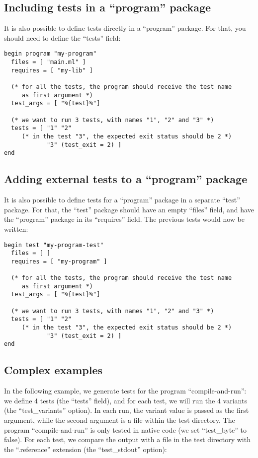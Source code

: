 \subsection{Including tests in a ``program'' package}

It is also possible to define tests directly in a ``program'' package.
For that, you should need to define the ``tests'' field:

\begin{verbatim}
begin program "my-program"
  files = [ "main.ml" ]
  requires = [ "my-lib" ]

  (* for all the tests, the program should receive the test name 
     as first argument *)
  test_args = [ "%{test}%"] 

  (* we want to run 3 tests, with names "1", "2" and "3" *)
  tests = [ "1" "2" 
     (* in the test "3", the expected exit status should be 2 *)
            "3" (test_exit = 2) ]
end
\end{verbatim}

\subsection{Adding external tests to a ``program'' package}

It is also possible to define tests for a ``program'' package
in a separate ``test'' package. For that, the ``test'' package should have
an empty ``files'' field, and have the ``program'' package in its
``requires'' field. The previous tests would now be written:

\begin{verbatim}
begin test "my-program-test"
  files = [ ]
  requires = [ "my-program" ]

  (* for all the tests, the program should receive the test name 
     as first argument *)
  test_args = [ "%{test}%"] 

  (* we want to run 3 tests, with names "1", "2" and "3" *)
  tests = [ "1" "2" 
     (* in the test "3", the expected exit status should be 2 *)
            "3" (test_exit = 2) ]
end
\end{verbatim}

\subsection{Complex examples}

In the following example, we generate tests for the program
``compile-and-run'': we define 4 tests (the ``tests'' field), and for
each test, we will run the 4 variants (the ``test\_variants''
option). In each run, the variant value is passed as the first
argument, while the second argument is a file within the test
directory. The program ``compile-and-run'' is only tested in native
code (we set ``test\_byte'' to false). For each test, we compare the
output with a file in the test directory with the ``.reference''
extension (the ``test\_stdout'' option):

